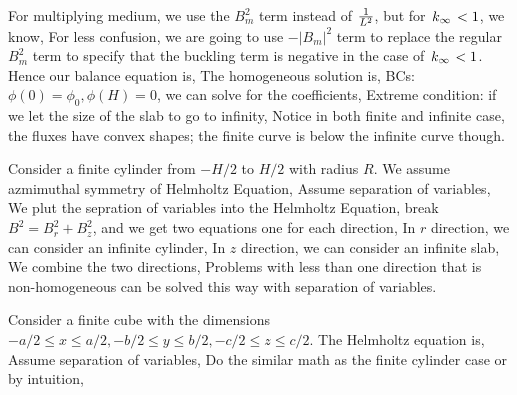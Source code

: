 \documentclass{school-22.211-notes}
\begin{document}
\clearpage
{}
For multiplying medium, we use the $B_m^2$ term instead of $\frac{1}{L^2}$, but for $\left. k_{\infty} \right. < 1$, we know,
For less confusion, we are going to use $-|B_m|^2$ term to replace the regular $B_m^2$ term to specify that the buckling term is negative in the case of $\left. k_{\infty} \right. < 1$. Hence our balance equation is, 
The homogeneous solution is, 
BCs: $\phi(0) = \phi_0, \phi(H) = 0$, we can solve for the coefficients, 
Extreme condition: if we let the size of the slab to go to infinity, 
Notice in both finite and infinite case, the fluxes have convex shapes; the finite curve is below the infinite curve though. 


\clearpage
{}
Consider a finite cylinder from $-H/2$ to $H/2$ with radius $R$. We assume azmimuthal symmetry of Helmholtz Equation, 
Assume separation of variables,
We plut the sepration of variables into the Helmholtz Equation, break $B^2 = B_r^2 + B_z^2$, and we get two equations one for each direction, 
In $r$ direction, we can consider an infinite cylinder, 
In $z$ direction, we can consider an infinite slab,
We combine the two directions,
Problems with less than one direction that is non-homogeneous can be solved this way with separation of variables. 

\clearpage
{} 
Consider a finite cube with the dimensions $-a/2 \le x \le a/2, -b/2 \le y \le b/2, -c/2 \le z \le c/2$. The Helmholtz equation is,
Assume separation of variables,
Do the similar math as the finite cylinder case or by intuition, 
\end{document}

